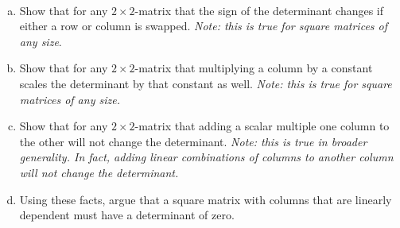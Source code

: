 \documentclass[12pt]{article} %
\begin{document}
\newpage
\begin{problem}~
\begin{enumerate}[(a)]
    \item Show that for any $2\times 2$-matrix that the sign of the determinant changes if either a row or column is swapped. \emph{Note: this is true for square matrices of any size}.
    \item Show that for any $2\times 2$-matrix that multiplying a column by a constant scales the determinant by that constant as well. \emph{Note: this is true for square matrices of any size.}
    \item Show that for any $2\times 2$-matrix that adding a scalar multiple one column to the other will not change the determinant. \emph{Note: this is true in broader generality. In fact, adding linear combinations of columns to another column will not change the determinant.}
    \item Using these facts, argue that a square matrix with columns that are linearly dependent must have a determinant of zero.
\end{enumerate}
\end{problem}
\end{document}

